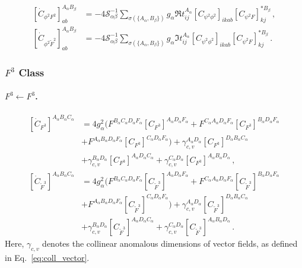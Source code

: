\begin{align}
    \left[\dot C_{\phi^2 F^2}\right]_{ab}^{A_\alpha B_\beta} &= -4\mathcal{S}_{\alpha\beta}^{-1}\sum_{\sigma(\{A_\alpha,B_\beta\})} g_\alpha \Re{ t_{ij}^{A_\alpha} \left[C_{\psi^2\phi^2}\right]_{ikab}\left[C_{\psi^2 F}\right]_{kj}^{*B_\beta}}\,,
    \\
    \left[\dot C_{\phi^2 \widetilde F^2}\right]_{ab}^{A_\alpha B_\beta} &= -4 \mathcal{S}_{\alpha\beta}^{-1} \sum_{\sigma(\{A_\alpha,B_\beta\})} g_\alpha \Im{ t_{ij}^{A_\alpha} \left[C_{\psi^2\phi^2}\right]_{ikab}\left[C_{\psi^2 F}\right]_{kj}^{*B_\beta}}\,.
\end{align}

\subsubsection{\texorpdfstring{$F^3$}{F3} Class}
\paragraph{\texorpdfstring{$F^3 \leftarrow F^3$}{F3fromF3}.}
\label{par:F3<-F3}

\begin{align}
    \left[\dot C_{F^3}\right]^{A_\alpha B_\alpha C_\alpha} &= 4 g_\alpha^2 \Big(F^{B_\alpha C_\alpha D_\alpha F_\alpha} \left[ C_{F^3}\right]^{A_\alpha D_\alpha F_\alpha} + F^{C_\alpha A_\alpha D_\alpha F_\alpha} \left[ C_{F^3}\right]^{B_\alpha D_\alpha F_\alpha}\nonumber \\& +F^{A_\alpha B_\alpha D_\alpha F_\alpha} \left[ C_{F^3}\right]^{C_\alpha D_\alpha F_\alpha}  \Big) + \gamma_{c,v}^{A_\alpha D_\alpha}\left[ C_{ F^3}\right]^{D_\alpha B_\alpha C_\alpha}\nonumber\\ 
    &
    + \gamma_{c,v}^{B_\alpha D_\alpha}\left[ C_{F^3}\right]^{A_\alpha D_\alpha C_\alpha} + \gamma_{c,v}^{C_\alpha D_\alpha}\left[ C_{F^3}\right]^{A_\alpha B_\alpha D_\alpha}\,,
    \label{eq:F3_to_F3}
\\
    \left[\dot{ C}_{\widetilde F^3}\right]^{A_\alpha B_\alpha C_\alpha} &= 4 g_\alpha^2 \Big(F^{B_\alpha C_\alpha D_\alpha F_\alpha} \left[  C_{\widetilde F^3}\right]^{A_\alpha D_\alpha F_\alpha} + F^{C_\alpha A_\alpha D_\alpha F_\alpha} \left[  C_{\widetilde F^3}\right]^{B_\alpha D_\alpha F_\alpha}\nonumber \\& +F^{A_\alpha B_\alpha D_\alpha F_\alpha} \left[  C_{\widetilde F^3}\right]^{C_\alpha D_\alpha F_\alpha}  \Big)+ \gamma_{c,v}^{A_\alpha D_\alpha}\left[ C_{\widetilde F^3}\right]^{D_\alpha B_\alpha C_\alpha}\nonumber\\ 
    &
    + \gamma_{c,v}^{B_\alpha D_\alpha}\left[ C_{\widetilde F^3}\right]^{A_\alpha D_\alpha C_\alpha} + \gamma_{c,v}^{C_\alpha D_\alpha}\left[ C_{\widetilde F^3}\right]^{A_\alpha B_\alpha D_\alpha}\,.
    \label{eq:F3t_to_F3t}
\end{align}
Here, $\gamma_{c,v}$ denotes the collinear anomalous dimensions of vector fields, as defined in Eq.\ \eqref{eq:coll_vector}.

